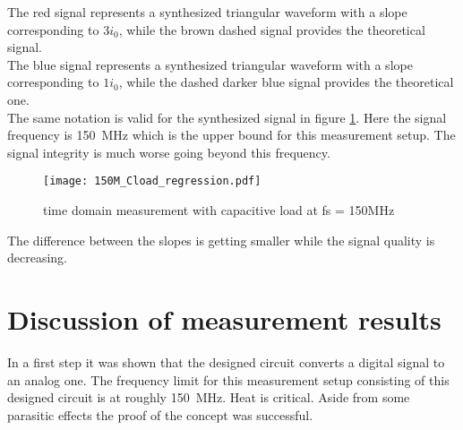 The red signal represents a synthesized triangular waveform with a slope corresponding to $3 i_0$, while the brown dashed signal provides the theoretical signal.\\
The blue signal represents a synthesized triangular waveform with a slope corresponding to $1 i_0$, while the dashed darker blue signal provides the theoretical one.\\
The same notation is valid for the synthesized signal in figure \ref{fig:measCload150M}.
Here the signal frequency is \SI{150}{\mega \hertz} which is the upper bound for this measurement setup.
The signal integrity is much worse going beyond this frequency.

\begin{figure}[htb!]
	\centering
  \texttt{[image: 150M\_Cload\_regression.pdf]}
	\caption{time domain measurement with capacitive load at fs = 150MHz}
	\label{fig:measCload150M}
\end{figure}

The difference between the slopes is getting smaller while the signal quality is decreasing.


\section{Discussion of measurement results}
In a first step it was shown that the designed circuit converts a digital signal to an analog one.
The frequency limit for this measurement setup consisting of this designed circuit is at roughly \SI{150}{\mega \hertz}.
Heat is critical. 
Aside from some parasitic effects the proof of the concept was successful.


